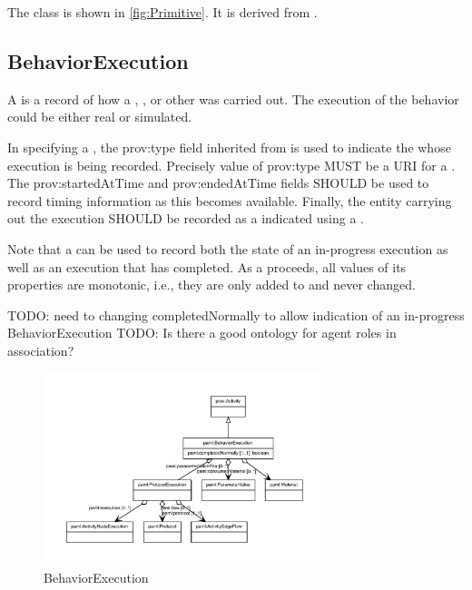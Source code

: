 %
The  class is shown in \ref{fig:Primitive}. It is derived from .%
%
\subsection{BehaviorExecution}%
\label{sec:paml:BehaviorExecution}%
A  is a record of how a , , or other  was carried out.
        The execution of the behavior could be either real or simulated.

        In specifying a , the prov:type field inherited from  is used to indicate the
         whose execution is being recorded. Precisely  value of prov:type MUST be a URI for a .
        The prov:startedAtTime and prov:endedAtTime fields SHOULD be used to record timing information as this becomes
        available.
        Finally, the entity carrying out the execution SHOULD be recorded as a  indicated using a
        .

        Note that a  can be used to record both the state of an in-progress execution as well as an
        execution that has completed. As a  proceeds, all values of its properties are monotonic,
        i.e., they are only added to and never changed.

        TODO: need to changing completedNormally to allow indication of an in-progress BehaviorExecution
        TODO: Is there a good ontology for agent roles in association?%
\newline%
\linebreak%


\begin{figure}[h!]%
\centering%
\includegraphics[width=0.7327659574468085\textwidth]{paml_classes/BehaviorExecution_abstraction_hierarchy.pdf}%
\caption{BehaviorExecution}%
\label{fig:BehaviorExecution}%
\end{figure}


